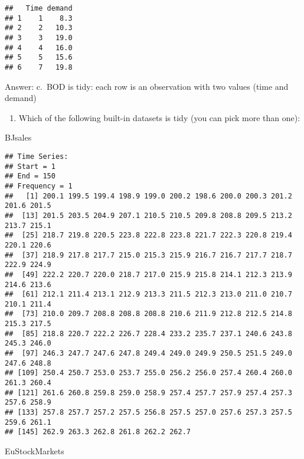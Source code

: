 \documentclass[
]{article}
\newenvironment{Shaded}{\begin{snugshade}}{\end{snugshade}}
\newcommand{\NormalTok}[1]{#1}
\providecommand{\tightlist}{%
  \setlength{\itemsep}{0pt}\setlength{\parskip}{0pt}}
\begin{document}
\begin{verbatim}
##   Time demand
## 1    1    8.3
## 2    2   10.3
## 3    3   19.0
## 4    4   16.0
## 5    5   15.6
## 6    7   19.8
\end{verbatim}

Answer: c.~BOD is tidy: each row is an observation with two values (time
and demand)

\begin{enumerate}
\def\labelenumi{\arabic{enumi}.}
\setcounter{enumi}{3}
\tightlist
\item
  Which of the following built-in datasets is tidy (you can pick more
  than one):
\end{enumerate}

\begin{Shaded}
\begin{Highlighting}[]
\NormalTok{BJsales}
\end{Highlighting}
\end{Shaded}

\begin{verbatim}
## Time Series:
## Start = 1 
## End = 150 
## Frequency = 1 
##   [1] 200.1 199.5 199.4 198.9 199.0 200.2 198.6 200.0 200.3 201.2 201.6 201.5
##  [13] 201.5 203.5 204.9 207.1 210.5 210.5 209.8 208.8 209.5 213.2 213.7 215.1
##  [25] 218.7 219.8 220.5 223.8 222.8 223.8 221.7 222.3 220.8 219.4 220.1 220.6
##  [37] 218.9 217.8 217.7 215.0 215.3 215.9 216.7 216.7 217.7 218.7 222.9 224.9
##  [49] 222.2 220.7 220.0 218.7 217.0 215.9 215.8 214.1 212.3 213.9 214.6 213.6
##  [61] 212.1 211.4 213.1 212.9 213.3 211.5 212.3 213.0 211.0 210.7 210.1 211.4
##  [73] 210.0 209.7 208.8 208.8 208.8 210.6 211.9 212.8 212.5 214.8 215.3 217.5
##  [85] 218.8 220.7 222.2 226.7 228.4 233.2 235.7 237.1 240.6 243.8 245.3 246.0
##  [97] 246.3 247.7 247.6 247.8 249.4 249.0 249.9 250.5 251.5 249.0 247.6 248.8
## [109] 250.4 250.7 253.0 253.7 255.0 256.2 256.0 257.4 260.4 260.0 261.3 260.4
## [121] 261.6 260.8 259.8 259.0 258.9 257.4 257.7 257.9 257.4 257.3 257.6 258.9
## [133] 257.8 257.7 257.2 257.5 256.8 257.5 257.0 257.6 257.3 257.5 259.6 261.1
## [145] 262.9 263.3 262.8 261.8 262.2 262.7
\end{verbatim}

\begin{Shaded}
\begin{Highlighting}[]
\NormalTok{EuStockMarkets}
\end{Highlighting}
\end{Shaded}
\end{document}
